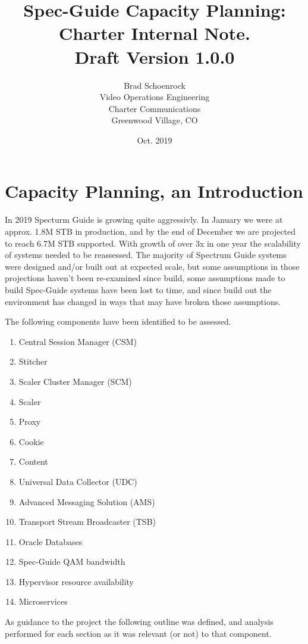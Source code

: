 \documentclass{article}
\author{Brad Schoenrock\\Video Operations Engineering\\Charter Communications\\Greenwood Village, CO}
\title{Spec-Guide Capacity Planning:\\Charter Internal Note.\\Draft Version 1.0.0}
\date{Oct. 2019}
\begin{document}
\maketitle
\newpage

\tableofcontents
\newpage

\section{Capacity Planning, an Introduction}
\label{SECTION-Introduction}

In 2019 Specturm Guide is growing quite aggressivly. In January we were at approx. 1.8M STB in production, and by the end of December we are projected to reach 6.7M STB supported. With growth of over 3x in one year the scalability of systems needed to be reassessed. The majority of Spectrum Guide systems were designed and/or built out at expected scale, but some assumptions in those projections haven't been re-examined since build, some assumptions made to build Spec-Guide systems have been lost to time, and since build out the environment has changed in ways that may have broken those assumptions. 

The following components have been identified to be assessed. 

\begin{enumerate}
\item Central Session Manager (CSM)
\item Stitcher 
\item Scaler Cluster Manager (SCM)
\item Scaler
\item Proxy
\item Cookie
\item Content
\item Universal Data Collector (UDC)
\item Advanced Messaging Solution (AMS)
\item Transport Stream Broadcaster (TSB)
\item Oracle Databases
\item Spec-Guide QAM bandwidth
\item Hypervisor resource availability
\item Microservices
\end{enumerate}

As guidance to the project the following outline was defined, and analysis performed for each section as it was relevant (or not) to that component.
\end{document}
